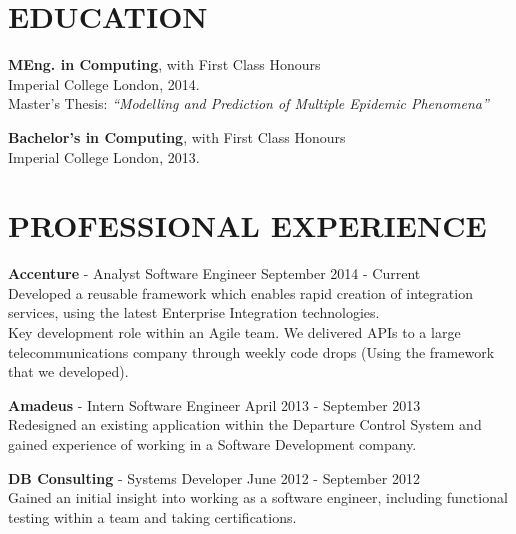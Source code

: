 \documentclass[margin, 10pt]{res} %
\begin{document}
\begin{resume}

\section{EDUCATION}

\textbf{MEng. in Computing}, with First Class Honours \\
Imperial College London, 2014. \\
Master’s Thesis: \textit{``Modelling and Prediction of Multiple Epidemic Phenomena''}

\textbf{Bachelor's in Computing}, with First Class Honours \\
Imperial College London, 2013. \\                                  

 
\section{PROFESSIONAL EXPERIENCE}

\textbf{Accenture} - Analyst Software Engineer \hfill September 2014 - Current \\
Developed a reusable framework which enables rapid creation of integration services, using the latest Enterprise Integration technologies. \\
Key development role within an Agile team. We delivered APIs to a large telecommunications company through weekly code drops (Using the framework that we developed).
 
\textbf{Amadeus} - Intern Software Engineer \hfill April 2013 - September 2013 \\
Redesigned an existing application within the Departure Control System and gained experience of working in a Software Development company.

\textbf{DB Consulting} - Systems Developer \hfill June 2012 - September 2012 \\
Gained an initial insight into working as a software engineer, including functional testing within a team and taking certifications. \\




\end{resume}
\end{document}
